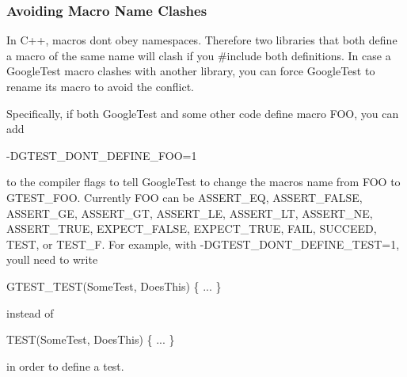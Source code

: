 \subsubsection*{Avoiding Macro Name Clashes}

In C++, macros don\textquotesingle{}t obey namespaces. Therefore two libraries that both define a macro of the same name will clash if you {\ttfamily \#include} both definitions. In case a Google\+Test macro clashes with another library, you can force Google\+Test to rename its macro to avoid the conflict.

Specifically, if both Google\+Test and some other code define macro F\+OO, you can add


\begin{DoxyCode}
-DGTEST\_DONT\_DEFINE\_FOO=1
\end{DoxyCode}


to the compiler flags to tell Google\+Test to change the macro\textquotesingle{}s name from {\ttfamily F\+OO} to {\ttfamily G\+T\+E\+S\+T\+\_\+\+F\+OO}. Currently {\ttfamily F\+OO} can be {\ttfamily A\+S\+S\+E\+R\+T\+\_\+\+EQ}, {\ttfamily A\+S\+S\+E\+R\+T\+\_\+\+F\+A\+L\+SE}, {\ttfamily A\+S\+S\+E\+R\+T\+\_\+\+GE}, {\ttfamily A\+S\+S\+E\+R\+T\+\_\+\+GT}, {\ttfamily A\+S\+S\+E\+R\+T\+\_\+\+LE}, {\ttfamily A\+S\+S\+E\+R\+T\+\_\+\+LT}, {\ttfamily A\+S\+S\+E\+R\+T\+\_\+\+NE}, {\ttfamily A\+S\+S\+E\+R\+T\+\_\+\+T\+R\+UE}, {\ttfamily E\+X\+P\+E\+C\+T\+\_\+\+F\+A\+L\+SE}, {\ttfamily E\+X\+P\+E\+C\+T\+\_\+\+T\+R\+UE}, {\ttfamily F\+A\+IL}, {\ttfamily S\+U\+C\+C\+E\+ED}, {\ttfamily T\+E\+ST}, or {\ttfamily T\+E\+S\+T\+\_\+F}. For example, with {\ttfamily -\/\+D\+G\+T\+E\+S\+T\+\_\+\+D\+O\+N\+T\+\_\+\+D\+E\+F\+I\+N\+E\+\_\+\+T\+E\+ST=1}, you\textquotesingle{}ll need to write


\begin{DoxyCode}
GTEST\_TEST(SomeTest, DoesThis) \{ ... \}
\end{DoxyCode}


instead of


\begin{DoxyCode}
TEST(SomeTest, DoesThis) \{ ... \}
\end{DoxyCode}


in order to define a test. 